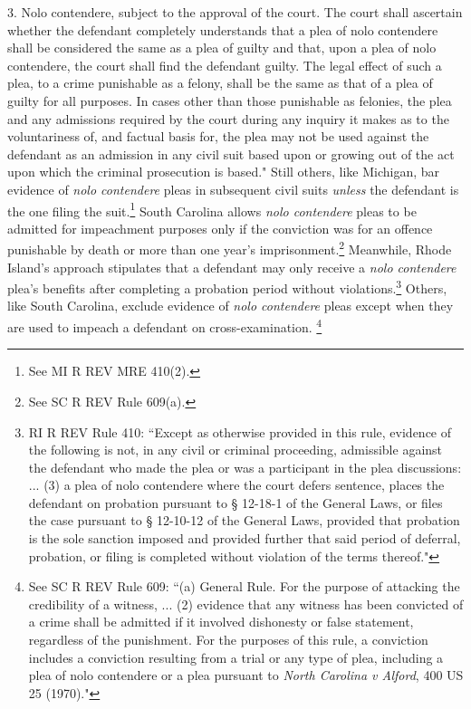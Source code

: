 {3. Nolo contendere, subject to the approval of the court. The court shall ascertain whether the defendant completely understands that a plea of nolo contendere shall be considered the same as a plea of guilty and that, upon a plea of nolo contendere, the court shall find the defendant guilty. The legal effect of such a plea, to a crime punishable as a felony, shall be the same as that of a plea of guilty for all purposes. In cases other than those punishable as felonies, the plea and any admissions required by the court during any inquiry it makes as to the voluntariness of, and factual basis for, the plea may not be used against the defendant as an admission in any civil suit based upon or growing out of the act upon which the criminal prosecution is based."} Still others, like Michigan, bar evidence of \textit{nolo contendere} pleas in subsequent civil suits \textit{unless} the defendant is the one filing the suit.\footnote{See MI R REV MRE 410(2).} South Carolina allows \textit{nolo contendere} pleas to be admitted for impeachment purposes only if the conviction was for an offence punishable by death or more than one year's imprisonment.\footnote{See SC R REV Rule 609(a).} Meanwhile, Rhode Island's approach stipulates that a defendant may only receive a \textit{nolo contendere} plea's benefits after completing a probation period without violations.\footnote{RI R REV Rule 410: ``Except as otherwise provided in this rule, evidence of the following is not, in any civil or criminal proceeding, admissible against the defendant who made the plea or was a participant in the plea discussions: ... (3) a plea of nolo contendere where the court defers sentence, places the defendant on probation pursuant to § 12-18-1 of the General Laws, or files the case pursuant to § 12-10-12 of the General Laws, provided that probation is the sole sanction imposed and provided further that said period of deferral, probation, or filing is completed without violation of the terms thereof."} Others, like South Carolina, exclude evidence of \textit{nolo contendere} pleas except when they are used to impeach a defendant on cross-examination. \footnote{See SC R REV Rule 609: ``(a) General Rule. For the purpose of attacking the credibility of a witness, ... (2) evidence that any witness has been convicted of a crime shall be admitted if it involved dishonesty or false statement, regardless of the punishment. For the purposes of this rule, a conviction includes a conviction resulting from a trial or any type of plea, including a plea of nolo contendere or a plea pursuant to \textit{North Carolina v Alford}, 400 US 25 (1970)."}

